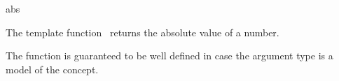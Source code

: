 \begin{ccRefFunction}{abs}

\ccDefinition

The template function \ccRefName\ returns the absolute value of a number.

The function is guaranteed to be well defined in case the argument type 
is a model of the  concept. 



\ccSeeAlso
{} \\
\\
 
\end{ccRefFunction}
